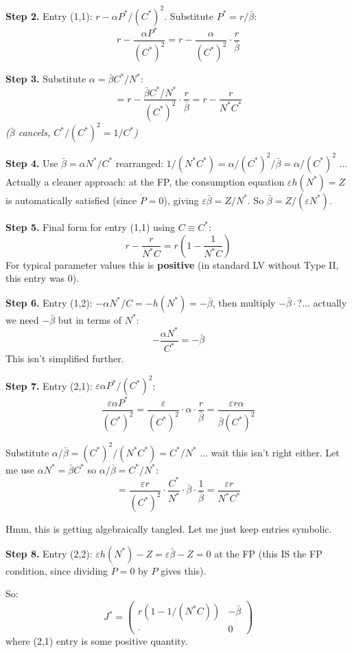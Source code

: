 \documentclass[10pt]{article}
\newcommand{\stepwhy}[1]{\textcolor{blue!60!black}{\small\textit{(#1)}}}
\begin{document}
\begin{solution}
\textbf{Step 2.} Entry (1,1): $r - \alpha P^*/(C^*)^2$. Substitute $P^* = r/\bar\beta$:
\[
r - \frac{\alpha P^*}{(C^*)^2} = r - \frac{\alpha}{(C^*)^2}\cdot\frac{r}{\bar\beta}
\]

\textbf{Step 3.} Substitute $\alpha = \bar\beta C^*/N^*$:
\[
= r - \frac{\bar\beta C^*/N^*}{(C^*)^2}\cdot\frac{r}{\bar\beta} = r - \frac{r}{N^* C^*}
\]
\stepwhy{$\bar\beta$ cancels, $C^*/(C^*)^2 = 1/C^*$}

\textbf{Step 4.} Use $\bar\beta = \alpha N^*/C^*$ rearranged: $1/(N^* C^*) = \alpha/(C^*)^2/\bar\beta = \alpha/(C^*)^2$ ... Actually a cleaner approach: at the FP, the consumption equation $\varepsilon h(N^*) = Z$ is automatically satisfied (since $\dot P = 0$), giving $\varepsilon\bar\beta = Z/N^*$. So $\bar\beta = Z/(\varepsilon N^*)$.

\textbf{Step 5.} Final form for entry (1,1) using $C \equiv C^*$:
\[
r - \frac{r}{N^* C} = r\left(1 - \frac{1}{N^* C}\right)
\]
For typical parameter values this is \textbf{positive} (in standard LV without Type II, this entry was 0).

\textbf{Step 6.} Entry (1,2): $-\alpha N^*/C = -h(N^*) = -\bar\beta$, then multiply $-\bar\beta\cdot ?$... actually we need $-\bar\beta$ but in terms of $N^*$:
\[
-\frac{\alpha N^*}{C^*} = -\bar\beta
\]
This isn't simplified further.

\textbf{Step 7.} Entry (2,1): $\varepsilon\alpha P^*/(C^*)^2$:
\[
\frac{\varepsilon\alpha P^*}{(C^*)^2} = \frac{\varepsilon}{(C^*)^2}\cdot\alpha\cdot\frac{r}{\bar\beta} = \frac{\varepsilon r\alpha}{\bar\beta (C^*)^2}
\]

Substitute $\alpha/\bar\beta = (C^*)^2/(N^* C^*) = C^*/N^*$ ... wait this isn't right either. Let me use $\alpha N^* = \bar\beta C^*$ so $\alpha/\bar\beta = C^*/N^*$:
\[
= \frac{\varepsilon r}{(C^*)^2}\cdot\frac{C^*}{N^*}\cdot\bar\beta\cdot\frac{1}{\bar\beta} = \frac{\varepsilon r}{N^* C^*}
\]

Hmm, this is getting algebraically tangled. Let me just keep entries symbolic.

\textbf{Step 8.} Entry (2,2): $\varepsilon h(N^*) - Z = \varepsilon\bar\beta - Z = 0$ at the FP (this IS the FP condition, since dividing $\dot P = 0$ by $P$ gives this).

So:
\[
J^* = \begin{pmatrix} r(1 - 1/(N^* C)) & -\bar\beta \\ \cdot & 0 \end{pmatrix}
\]
where (2,1) entry is some positive quantity.


\end{solution}
\end{document}
